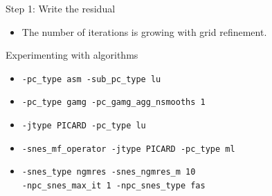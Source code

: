 \documentclass{beamer}
\begin{document}
\begin{frame}{Step 1: Write the residual}
\begin{itemize}
{{  0 SNES Function norm 1.441189193029e-01 \\
  Linear solve converged due to CONVERGED\_RTOL iterations 101\\
  1 SNES Function norm 1.409860069506e-06 \\
  Linear solve converged due to CONVERGED\_RTOL iterations 154\\
  2 SNES Function norm 1.390912345257e-11 \\
CONVERGED\_FNORM\_RELATIVE Number of nonlinear iterations = 2
}}
  \item<6> The number of iterations is growing with grid refinement.
  \end{itemize}
\end{frame}
\begin{frame}[fragile]{Experimenting with algorithms}
  \begin{itemize}
  \item \verb|-pc_type asm -sub_pc_type lu|
  \item \verb|-pc_type gamg -pc_gamg_agg_nsmooths 1|
  \item \verb|-jtype PICARD -pc_type lu|
  \item \verb|-snes_mf_operator -jtype PICARD -pc_type ml|
  \item \verb|-snes_type ngmres -snes_ngmres_m 10| \\
    \qquad \verb|-npc_snes_max_it 1 -npc_snes_type fas|
  \end{itemize}
\end{frame}
\end{document}
